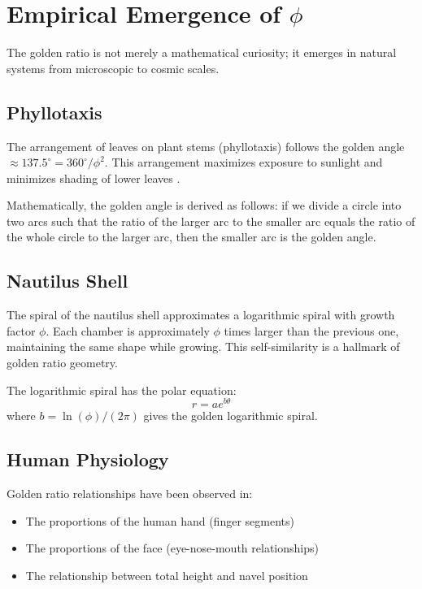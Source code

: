 \section{Empirical Emergence of $\phi$}

The golden ratio is not merely a mathematical curiosity; it emerges in natural systems from microscopic to cosmic scales.

\subsection{Phyllotaxis}

The arrangement of leaves on plant stems (phyllotaxis) follows the golden angle $\approx 137.5^\circ = 360^\circ/\phi^2$. This arrangement maximizes exposure to sunlight and minimizes shading of lower leaves \cite{livio_fibonacci_numbers}.

Mathematically, the golden angle is derived as follows: if we divide a circle into two arcs such that the ratio of the larger arc to the smaller arc equals the ratio of the whole circle to the larger arc, then the smaller arc is the golden angle.

\subsection{Nautilus Shell}

The spiral of the nautilus shell approximates a logarithmic spiral with growth factor $\phi$. Each chamber is approximately $\phi$ times larger than the previous one, maintaining the same shape while growing. This self-similarity is a hallmark of golden ratio geometry.

The logarithmic spiral has the polar equation:
\[
r = a e^{b\theta}
\]
where $b = \ln(\phi)/(2\pi)$ gives the golden logarithmic spiral.

\subsection{Human Physiology}

Golden ratio relationships have been observed in:
\begin{itemize}
    \item The proportions of the human hand (finger segments)
    \item The proportions of the face (eye-nose-mouth relationships)
    \item The relationship between total height and navel position
\end{itemize}

